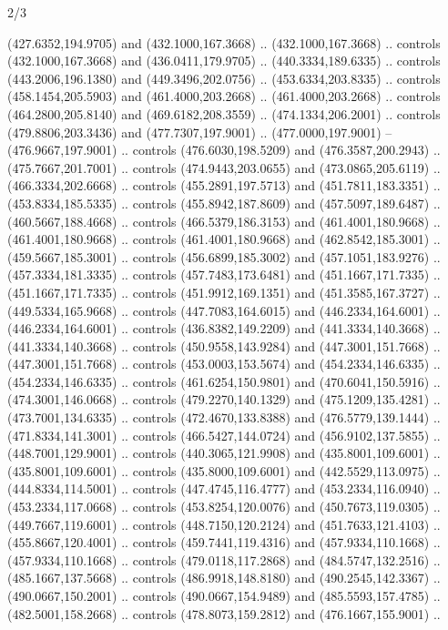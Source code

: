 \begin{flagdescription}{2/3}
\begin{scope}[xshift=0.5\flaglength,yshift=0.5\flagwidth,scale=\flagwidth/525.28]
\begin{scope}[y=0.1mm, x=0.1mm, yscale=-1,shift={(-381.5,-404)}]
\begin{scope}[shift={(5.25001,4.53053)},miter limit=4.00,line width=0.800\lw]
  (427.6352,194.9705) and (432.1000,167.3668) .. (432.1000,167.3668) .. controls
  (432.1000,167.3668) and (436.0411,179.9705) .. (440.3334,189.6335) .. controls
  (443.2006,196.1380) and (449.3496,202.0756) .. (453.6334,203.8335) .. controls
  (458.1454,205.5903) and (461.4000,203.2668) .. (461.4000,203.2668) .. controls
  (464.2800,205.8140) and (469.6182,208.3559) .. (474.1334,206.2001) .. controls
  (479.8806,203.3436) and (477.7307,197.9001) .. (477.0000,197.9001) --
  (476.9667,197.9001) .. controls (476.6030,198.5209) and (476.3587,200.2943) ..
  (475.7667,201.7001) .. controls (474.9443,203.0655) and (473.0865,205.6119) ..
  (466.3334,202.6668) .. controls (455.2891,197.5713) and (451.7811,183.3351) ..
  (453.8334,185.5335) .. controls (455.8942,187.8609) and (457.5097,189.6487) ..
  (460.5667,188.4668) .. controls (466.5379,186.3153) and (461.4001,180.9668) ..
  (461.4001,180.9668) .. controls (461.4001,180.9668) and (462.8542,185.3001) ..
  (459.5667,185.3001) .. controls (456.6899,185.3002) and (457.1051,183.9276) ..
  (457.3334,181.3335) .. controls (457.7483,173.6481) and (451.1667,171.7335) ..
  (451.1667,171.7335) .. controls (451.9912,169.1351) and (451.3585,167.3727) ..
  (449.5334,165.9668) .. controls (447.7083,164.6015) and (446.2334,164.6001) ..
  (446.2334,164.6001) .. controls (436.8382,149.2209) and (441.3334,140.3668) ..
  (441.3334,140.3668) .. controls (450.9558,143.9284) and (447.3001,151.7668) ..
  (447.3001,151.7668) .. controls (453.0003,153.5674) and (454.2334,146.6335) ..
  (454.2334,146.6335) .. controls (461.6254,150.9801) and (470.6041,150.5916) ..
  (474.3001,146.0668) .. controls (479.2270,140.1329) and (475.1209,135.4281) ..
  (473.7001,134.6335) .. controls (472.4670,133.8388) and (476.5779,139.1444) ..
  (471.8334,141.3001) .. controls (466.5427,144.0724) and (456.9102,137.5855) ..
  (448.7001,129.9001) .. controls (440.3065,121.9908) and (435.8001,109.6001) ..
  (435.8001,109.6001) .. controls (435.8000,109.6001) and (442.5529,113.0975) ..
  (444.8334,114.5001) .. controls (447.4745,116.4777) and (453.2334,116.0940) ..
  (453.2334,117.0668) .. controls (453.8254,120.0076) and (450.7673,119.0305) ..
  (449.7667,119.6001) .. controls (448.7150,120.2124) and (451.7633,121.4103) ..
  (455.8667,120.4001) .. controls (459.7441,119.4316) and (457.9334,110.1668) ..
  (457.9334,110.1668) .. controls (479.0118,117.2868) and (484.5747,132.2516) ..
  (485.1667,137.5668) .. controls (486.9918,148.8180) and (490.2545,142.3367) ..
  (490.0667,150.2001) .. controls (490.0667,154.9489) and (485.5593,157.4785) ..
  (482.5001,158.2668) .. controls (478.8073,159.2812) and (476.1667,155.9001) ..

\end{scope}
\end{scope}
\end{scope}
\end{flagdescription}
